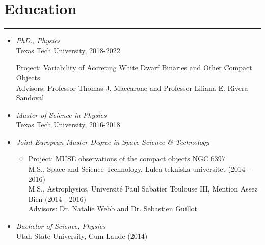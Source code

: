 \documentclass[letterpaper,10pt]{article}
\begin{document}
\section*{Education}

\hrule
\vspace{.3 cm}


\begin{itemize}[label=$\blacktriangleright$]



  \item \emph{PhD., Physics}  \\
   Texas Tech University, 2018-2022
      \begin{itemize}[label=]
     Project: Variability of Accreting White Dwarf Binaries and Other Compact Objects  \\
     Advisors: Professor Thomas J. Maccarone and Professor Liliana E. Rivera Sandoval 
      \end{itemize}





  \item \emph{Master of Science in Physics}  \\
   Texas Tech University, 2016-2018



  \item \emph{Joint European Master Degree in Space Science \& Technology} 
  \begin{itemize}[label=]
      \vspace{-.05cm}
      \item Project: MUSE observations of the compact objects NGC 6397 \\
      M.S., Space and Science Technology, Lule\r a tekniska universitet  (2014 - 2016) \\
      M.S., Astrophysics, Universit\'e Paul Sabatier Toulouse III, Mention Assez Bien (2014 - 2016) \\
      Advisors: Dr. Natalie Webb and Dr. Sebastien Guillot
  \end{itemize}




  \item \emph{Bachelor of Science, Physics}  \\
   Utah State University, Cum Laude (2014)

\end{itemize}
\end{document}
